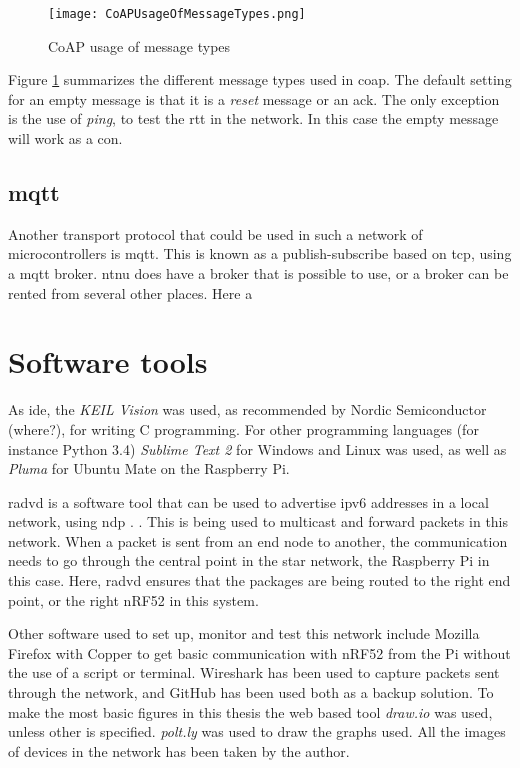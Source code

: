 \begin{figure}[ht]
    \centering
    \texttt{[image: CoAPUsageOfMessageTypes.png]}    
    \caption{CoAP usage of message types}
    \label{fig:CoAPUsageOfMessageTypes}
\end{figure}

Figure \ref{fig:CoAPUsageOfMessageTypes} summarizes the different message types used in \gls{coap}. The default setting for an empty message is that it is a \textit{reset} message or an \gls{ack}. The only exception is the use of \textit{ping}, to test the \gls{rtt} in the network. In this case the empty message will work as a \gls{con}.

\subsection{\gls{mqtt}}

Another transport protocol that could be used in such a network of microcontrollers is \gls{mqtt}. This is  known as a publish-subscribe based on \gls{tcp}, using a \gls{mqtt} broker. \gls{ntnu} does have a broker that is possible to use, or a broker can be rented from several other places. Here a 

\cite{hunkeler2008mqtt}



\section{Software tools}


As \gls{ide}, the \textit{KEIL Vision} was used, as recommended by Nordic Semiconductor (where?), for writing C programming. For other programming languages (for instance Python 3.4) \textit{Sublime Text 2} for Windows and Linux was used, as well as \textit{Pluma} for Ubuntu Mate on the Raspberry Pi. 

\gls{radvd} is a software tool that can be used to advertise \gls{ipv6} addresses in a local network, using \gls{ndp} \cite{chown2011rogue}. . This is being used to multicast and forward packets in this network. When a packet is sent from an end node to another, the communication needs to go through the central point in the star network, the Raspberry Pi in this case. Here, \gls{radvd} ensures that the packages are being routed to the right end point, or the right nRF52 in this system. 

Other software used to set up, monitor and test this network include Mozilla Firefox with Copper  to get basic communication with nRF52 from the Pi without the use of a script or terminal. Wireshark has been used to capture packets sent through the network, and GitHub has been used both as a backup solution. To make the most basic figures in this thesis the web based tool \textit{draw.io} was used, unless other is specified. \textit{polt.ly} was used to draw the graphs used. All the images of devices in the network has been taken by the author. 



